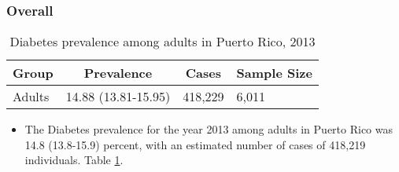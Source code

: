 
\subsubsection{Overall}




\begin{table}[H]
\caption{Diabetes prevalence among adults in Puerto Rico, 2013\label{tab:Overall.tabl.Diabetes.2013}} 
\begin{center}
\begin{tabular}{llll}
\hline\hline
\multicolumn{1}{l}{Group}&\multicolumn{1}{c}{Prevalence}&\multicolumn{1}{c}{Cases}&\multicolumn{1}{c}{Sample Size}\tabularnewline
\hline
Adults&14.88 (13.81-15.95)&418,229&6,011\tabularnewline
\hline
\end{tabular}\end{center}

\end{table}




\begin{itemize}


\item The Diabetes prevalence for the year 2013 among adults in Puerto Rico was 14.8 (13.8-15.9) percent, with an estimated number of cases of 418,219 individuals.
Table \ref{tab:Overall.tabl.Diabetes.2013}.

\end{itemize}



